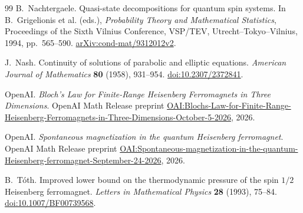 \begin{thebibliography}{99}
B.~Nachtergaele.
Quasi-state decompositions for quantum spin systems.
In B.~Grigelionis et al. (eds.),
\emph{Probability Theory and Mathematical Statistics},
Proceedings of the Sixth Vilnius Conference,
VSP/TEV, Utrecht--Tokyo--Vilnius, 1994, pp.~565--590.
\href{https://arxiv.org/abs/cond-mat/9312012v2}{arXiv:cond-mat/9312012v2}.

J.~Nash.
Continuity of solutions of parabolic and elliptic equations.
\emph{American Journal of Mathematics} \textbf{80} (1958), 931--954.
\href{https://doi.org/10.2307/2372841}{doi:10.2307/2372841}.

OpenAI.
\emph{Bloch's Law for Finite-Range Heisenberg Ferromagnets in Three Dimensions}.
OpenAI Math Release preprint
\href{https://github.com/openai/math/blob/main/preprints/Blochs-Law-for-Finite-Range-Heisenberg-Ferromagnets-in-Three-Dimensions-October-5-2026/bloch-law-heisenberg.pdf}{OAI:Blochs-Law-for-Finite-Range-Heisenberg-Ferromagnets-in-Three-Dimensions-October-5-2026},
2026.

OpenAI.
\emph{Spontaneous magnetization in the quantum Heisenberg ferromagnet}.
OpenAI Math Release preprint
\href{https://github.com/openai/math/blob/main/preprints/Spontaneous-magnetization-in-the-quantum-Heisenberg-ferromagnet-September-24-2026/paper.pdf}{OAI:Spontaneous-magnetization-in-the-quantum-Heisenberg-ferromagnet-September-24-2026},
2026.

B.~T\'oth.
Improved lower bound on the thermodynamic pressure of the spin \(1/2\)
Heisenberg ferromagnet.
\emph{Letters in Mathematical Physics} \textbf{28} (1993), 75--84.
\href{https://doi.org/10.1007/BF00739568}{doi:10.1007/BF00739568}.

\end{thebibliography}
